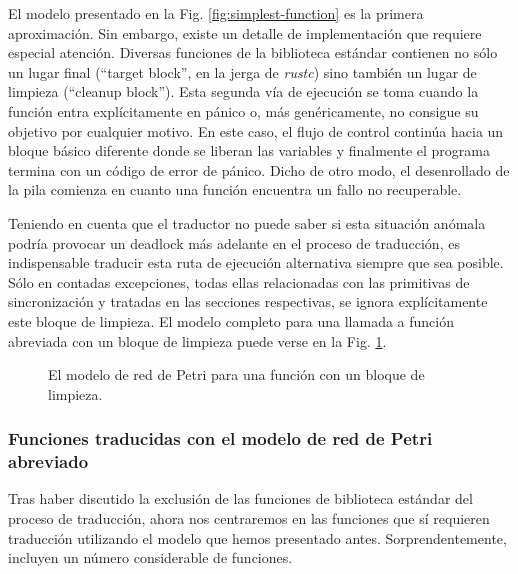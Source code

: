 El modelo presentado en la Fig. \ref{fig:simplest-function} es la primera aproximación.
Sin embargo, existe un detalle de implementación que requiere especial atención.
Diversas funciones de la biblioteca estándar contienen no sólo un lugar final
(``target block'', en la jerga de \emph{rustc}) sino
también un lugar de limpieza (``cleanup block'').
Esta segunda vía de ejecución se toma
cuando la función entra explícitamente en pánico o, más genéricamente, no consigue su
objetivo por cualquier motivo. En este caso, el flujo de control continúa hacia un
bloque básico diferente donde se liberan las variables y finalmente el programa termina con un
código de error de pánico. Dicho de otro modo, el desenrollado de la pila comienza en cuanto
una función encuentra un fallo no recuperable.

Teniendo en cuenta que el traductor no puede saber si esta situación anómala podría provocar
un deadlock más adelante en el proceso de traducción, es indispensable traducir esta ruta de
ejecución alternativa siempre que sea posible. Sólo en contadas excepciones, todas ellas
relacionadas con las primitivas de sincronización y tratadas en las secciones respectivas, se
ignora explícitamente este bloque de limpieza. El modelo completo para una llamada a función
abreviada con un bloque de limpieza puede verse en la Fig. \ref{fig:function-with-cleanup}.

\begin{figure}[!htb]
    \centering
    
    \caption{El modelo de red de Petri para una función con un bloque de limpieza.}
    \label{fig:function-with-cleanup}
\end{figure}

\subsubsection{Funciones traducidas con el modelo de red de Petri abreviado}

Tras haber discutido la exclusión de las funciones de biblioteca estándar del proceso de
traducción, ahora nos centraremos en las funciones que sí requieren traducción utilizando el
modelo que hemos presentado antes. Sorprendentemente, incluyen un número considerable de
funciones.

